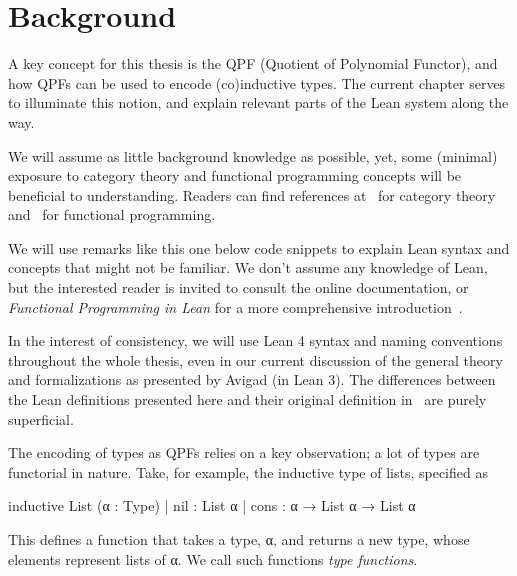 \chapter{Background}%
\label{ch:background}

A key concept for this thesis is the QPF (Quotient of Polynomial Functor), and how QPFs can be used to encode (co)inductive types. The current chapter serves to illuminate this notion, and explain relevant parts of the Lean system along the way.

We will assume as little background knowledge as possible, yet, some (minimal) exposure to category theory and functional programming concepts will be beneficial to understanding. Readers can find references at~\cite{awodeyCategoryTheory2010,milewskiCategoryTheoryProgrammers2019} for category theory and~\cite{christiansenFunctionalProgrammingLean} for functional programming.


\begin{remark}
    We will use remarks like this one below code snippets to explain Lean syntax and concepts that might not be familiar. We don't assume any knowledge of Lean, but the interested reader is invited to consult the online documentation, or \emph{Functional Programming in Lean} for a more comprehensive introduction~\cite{avigadTheoremProvingLean,christiansenFunctionalProgrammingLean}.
\end{remark}

In the interest of consistency, we will use Lean 4 syntax and naming conventions throughout the whole thesis,
even in our current discussion of the general theory and formalizations as presented by Avigad \etal{} (in Lean 3).
The differences between the Lean definitions presented here and their original definition in~\cite{avigadDataTypesQuotients2019a} are purely superficial.



The encoding of types as QPFs relies on a key observation; a lot of types are functorial in nature.
Take, for example, the inductive type of lists, specified as
\begin{leancode}
  inductive List (α : Type)
    | nil  : List α
    | cons : α → List α → List α
\end{leancode}

This defines a function  that takes a type, α, and returns a new type, whose elements represent lists of α.
We call such functions \emph{type functions}.

